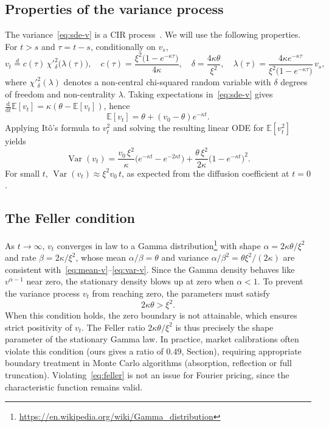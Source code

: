 \documentclass[11pt,a4paper]{article}
\theoremstyle{plain}
\theoremstyle{definition}
\newcommand{\dd}{\mathrm{d}}
\newcommand{\E}{\mathbb{E}}
\newcommand{\Var}{\operatorname{Var}}
\begin{document}
\subsection{Properties of the variance process}
The variance~\eqref{eq:sde-v} is a CIR process~\cite{cir}. We will use the following properties.
For $t>s$ and $\tau=t-s$, conditionally on $v_s$,
\begin{equation}
    v_t \overset{d}{=} c(\tau)\,\chi'^2_{\delta}\bigl(\lambda(\tau)\bigr), \quad
    c(\tau)=\frac{\xi^2\bigl(1-e^{-\kappa\tau}\bigr)}{4\kappa},\quad
    \delta=\frac{4\kappa\theta}{\xi^2},\quad
    \lambda(\tau)=\frac{4\kappa e^{-\kappa\tau}}{\xi^2\bigl(1-e^{-\kappa\tau}\bigr)}\,v_s,
    \label{eq:cir-transition}
\end{equation}
where $\chi'^2_\delta(\lambda)$ denotes a non-central chi-squared random variable with $\delta$ degrees of freedom and non-centrality $\lambda$.
Taking expectations in~\eqref{eq:sde-v} gives $\frac{\dd}{\dd t}\E[v_t]=\kappa(\theta-\E[v_t])$, hence
\begin{equation}
    \E[v_t] = \theta + (v_0-\theta)e^{-\kappa t}.
    \label{eq:mean-v}
\end{equation}
Applying It\^o's formula to $v_t^2$ and solving the resulting linear ODE for $\E[v_t^2]$ yields
\begin{equation}
    \Var(v_t) = \frac{v_0\,\xi^2}{\kappa}\bigl(e^{-\kappa t}-e^{-2\kappa t}\bigr)
    + \frac{\theta\,\xi^2}{2\kappa}\bigl(1-e^{-\kappa t}\bigr)^2.
    \label{eq:var-v}
\end{equation}
For small $t$, $\Var(v_t)\approx \xi^2 v_0\, t$, as expected from the diffusion coefficient at $t=0$.

\subsection{The Feller condition}


As $t\to\infty$, $v_t$ converges in law to a Gamma distribution\footnote{\url{https://en.wikipedia.org/wiki/Gamma_distribution}} with shape $\alpha=2\kappa\theta/\xi^2$ and rate $\beta=2\kappa/\xi^2$, whose mean $\alpha/\beta=\theta$ and variance $\alpha/\beta^2=\theta\xi^2/(2\kappa)$ are consistent with~\eqref{eq:mean-v}--\eqref{eq:var-v}. Since the Gamma density behaves like $v^{\alpha-1}$ near zero, the stationary density blows up at zero when $\alpha<1$.
To prevent the variance process $v_t$ from reaching zero, the parameters must satisfy
\begin{equation}
    2 \kappa \theta > \xi^2.
    \label{eq:feller}
\end{equation}
When this condition holds, the zero boundary is not attainable, which ensures strict positivity of $v_t$. The Feller ratio $2\kappa\theta/\xi^2$ is thus precisely the shape parameter of the stationary Gamma law. In practice, market calibrations often violate this condition (ours gives a ratio of $0.49$, Section), requiring appropriate boundary treatment in Monte Carlo algorithms (absorption, reflection or full truncation). Violating~\eqref{eq:feller} is not an issue for Fourier pricing, since the characteristic function remains valid.
\end{document}
